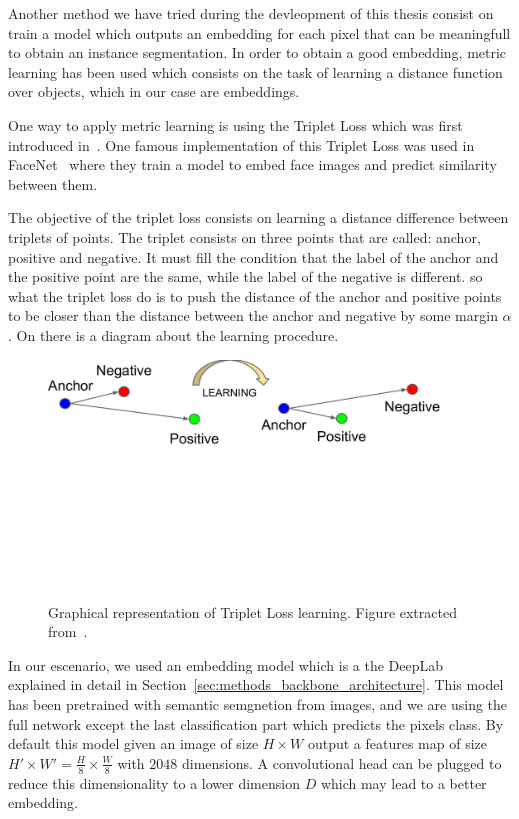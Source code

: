 Another method we have tried during the devleopment of this thesis consist on train a model which outputs an embedding for each pixel that can be meaningfull to obtain an instance segmentation.
In order to obtain a good embedding, metric learning has been used which consists on the task of learning a distance function over objects, which in our case are embeddings.

One way to apply metric learning is using the Triplet Loss which was first introduced in~\cite{balntas2016learning}.
One famous implementation of this Triplet Loss was used in FaceNet~\cite{schroff2015facenet} where they train a model to embed face images and predict similarity between them.

The objective of the triplet loss consists on learning a distance difference between triplets of points.
The triplet consists on three points that are called: anchor, positive and negative.
It must fill the condition that the label of the anchor and the positive point are the same, while the label of the negative is different.
so what the triplet loss do is to push the distance of the anchor and positive points to be closer than the distance between the anchor and negative by some margin $\alpha$.
On  there is a diagram about the learning procedure.

\begin{figure}[h]
  \centering
  \includegraphics[trim=1cm 10cm 2.5cm 0cm, width=0.7\linewidth]{figures/methods/triplet_loss/triplet_viz.pdf}
  \caption{
    Graphical representation of Triplet Loss learning.
    Figure extracted from~\cite{schroff2015facenet}. }
  \label{fig:triplet_loss_viz}
\end{figure}

In our escenario, we used an embedding model which is a the DeepLab~\cite{chen2018deeplab} explained in detail in Section~\ref{sec:methods_backbone_architecture}.
This model has been pretrained with semantic semgnetion from images, and we are using the full network except the last classification part which predicts the pixels class.
By default this model given an image of size $H \times W$ output a features map of size $H' \times W' = \frac{H}{8} \times \frac{W}{8}$ with $2048$ dimensions.
A convolutional head can be plugged to reduce this dimensionality to a lower dimension $D$ which may lead to a better embedding.

